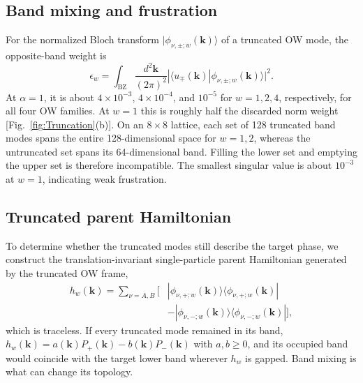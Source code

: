 \documentclass[aps,prb,10pt,twocolumn,superscriptaddress,longbibliography,floatfix]{revtex4-2}
\newcommand{\mr}[1]{\mathrm{#1}}
\newcommand{\bk}{\boldsymbol k}
\newcommand{\newtext}[1]{{\color{blue}#1}}
\begin{document}
{\color{blue}
\subsection{Band mixing and frustration}
\newtext{For the normalized Bloch transform $|\phi_{\nu,\pm;w}(\bk)\rangle$ of a truncated OW mode, the opposite-band weight is}
\begin{equation}
 \epsilon_w=\int_{\mr{BZ}}\frac{d^2\bk}{(2\pi)^2}
 |\langle u_\mp(\bk)|\phi_{\nu,\pm;w}(\bk)\rangle|^2.
 \label{eq:BandLeakage}
\end{equation}
\newtext{At $\alpha=1$, it is about $4\times10^{-3}$, $4\times10^{-4}$, and $10^{-5}$ for $w=1,2,4$, respectively, for all four OW families. At $w=1$ this is roughly half the discarded norm weight [Fig.~\ref{fig:Truncation}(b)]. On an $8\times8$ lattice, each set of 128 truncated band modes spans the entire 128-dimensional space for $w=1,2$, whereas the untruncated set spans its 64-dimensional band. Filling the lower set and emptying the upper set is therefore incompatible. The smallest singular value is about $10^{-3}$ at $w=1$, indicating weak frustration.}

}

\subsection{Truncated parent Hamiltonian}
\label{app:TruncatedParent}

To determine whether the truncated modes still describe the target phase, we construct the translation-invariant single-particle parent Hamiltonian generated by the truncated OW frame,
\begin{align}
    h_w(\bk)=\sum_{\nu=A,B}\Big[&|\phi_{\nu,+;w}(\bk)\rangle\langle\phi_{\nu,+;w}(\bk)|\nonumber\\
    &-|\phi_{\nu,-;w}(\bk)\rangle\langle\phi_{\nu,-;w}(\bk)|\Big],
    \label{eq:TruncatedParent}
\end{align}
which is traceless. If every truncated mode remained in its band, $h_w(\bk)=a(\bk)P_+(\bk)-b(\bk)P_-(\bk)$ with $a,b\geq0$, and its occupied band would coincide with the target lower band wherever $h_w$ is gapped. Band mixing is what can change its topology.
\end{document}
